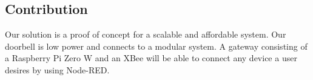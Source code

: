 
\subsection{Contribution}
Our solution is a proof of concept for a scalable and affordable system. Our doorbell is low power and connects to a modular system. A gateway consisting of a Raspberry Pi Zero W and an XBee will be able to connect any device a user desires by using Node-RED.
